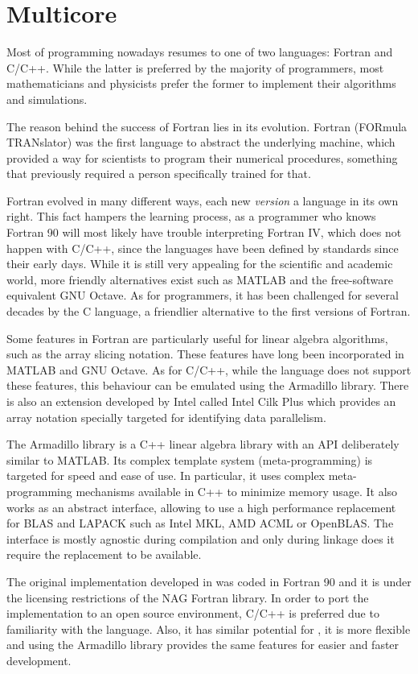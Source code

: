 \documentclass[../thesis]{subfiles}
\begin{document}
	\chapter{Multicore}
	Most of \hpc programming nowadays resumes to one of two languages: Fortran and C/C++. While the latter is preferred by the majority of programmers, most mathematicians and physicists prefer the former to implement their algorithms and simulations.

	The reason behind the success of Fortran lies in its evolution. Fortran (FORmula TRANslator) was the first language to abstract the underlying machine, which provided a way for scientists to program their numerical procedures, something that previously required a person specifically trained for that.

	Fortran evolved in many different ways, each new \textit{version} a language in its own right. This fact hampers the learning process, as a programmer who knows Fortran 90 will most likely have trouble interpreting Fortran IV, which does not happen with C/C++, since the languages have been defined by standards since their early days. While it is still very appealing for the scientific and academic world, more friendly alternatives exist such as MATLAB and the free-software equivalent GNU Octave. As for programmers, it has been challenged for several decades by the C language, a friendlier alternative to the first versions of Fortran.

	Some features in Fortran are particularly useful for linear algebra algorithms, such as the array slicing notation. These features have long been incorporated in MATLAB and GNU Octave. As for C/C++, while the language does not support these features, this behaviour can be emulated using the Armadillo library. There is also an extension developed by Intel called Intel Cilk Plus which provides an array notation specially targeted for identifying data parallelism.

	The Armadillo library is a C++ linear algebra library with an API deliberately similar to MATLAB. Its complex template system (meta-programming) is targeted for speed and ease of use. In particular, it uses complex meta-programming mechanisms available in C++ to minimize memory usage. It also works as an abstract interface, allowing to use a high performance replacement for BLAS and LAPACK such as Intel MKL, AMD ACML or OpenBLAS. The interface is mostly agnostic during compilation and only during linkage does it require the replacement to be available.

	The original implementation developed in \cite{Deadman:Higham:Ralha:2013} was coded in Fortran 90 and it is under the licensing restrictions of the NAG Fortran library. In order to port the implementation to an open source environment, C/C++ is preferred due to familiarity with the language. Also, it has similar potential for \hpc, it is more flexible and using the Armadillo library provides the same features for easier and faster development.
\end{document}
